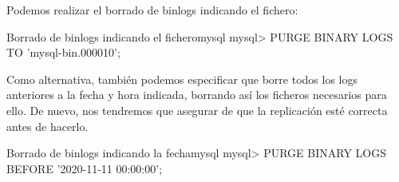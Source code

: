Podemos realizar el borrado de binlogs indicando el fichero:

\begin{mycode}{Borrado de binlogs indicando el fichero}{mysql}{}
mysql> PURGE BINARY LOGS TO 'mysql-bin.000010';
\end{mycode}


Como alternativa, también podemos especificar que borre todos los logs anteriores a la fecha y hora indicada, borrando así los ficheros necesarios para ello. De nuevo, nos tendremos que asegurar de que la replicación esté correcta antes de hacerlo.


\begin{mycode}{Borrado de binlogs indicando la fecha}{mysql}{}
mysql> PURGE BINARY LOGS BEFORE '2020-11-11 00:00:00';
\end{mycode}